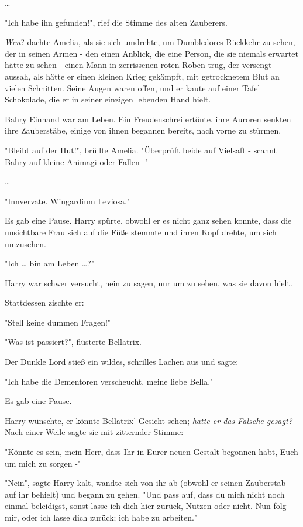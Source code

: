 {…

"Ich habe ihn gefunden!", rief die Stimme des alten Zauberers.

\emph{Wen}? dachte Amelia, als sie sich umdrehte, um Dumbledores Rückkehr zu sehen, der in seinen Armen - den einen Anblick, die eine Person, die sie niemals erwartet hätte zu sehen - einen Mann in zerrissenen roten Roben trug, der versengt aussah, als hätte er einen kleinen Krieg gekämpft, mit getrocknetem Blut an vielen Schnitten. Seine Augen waren offen, und er kaute auf einer Tafel Schokolade, die er in seiner einzigen lebenden Hand hielt.

Bahry Einhand war am Leben. Ein Freudenschrei ertönte, ihre Auroren senkten ihre Zauberstäbe, einige von ihnen begannen bereits, nach vorne zu stürmen.

"Bleibt auf der Hut!", brüllte Amelia. "Überprüft beide auf Vielsaft - scannt Bahry auf kleine Animagi oder Fallen -"

…

"Innvervate. Wingardium Leviosa."

Es gab eine Pause. Harry spürte, obwohl er es nicht ganz sehen konnte, dass die unsichtbare Frau sich auf die Füße stemmte und ihren Kopf drehte, um sich umzusehen.

"Ich … bin am Leben …?"

Harry war schwer versucht, nein zu sagen, nur um zu sehen, was sie davon hielt.

Stattdessen zischte er:

"Stell keine dummen Fragen!"

"Was ist passiert?", flüsterte Bellatrix.

Der Dunkle Lord stieß ein wildes, schrilles Lachen aus und sagte:

"Ich habe die Dementoren verscheucht, meine liebe Bella."

Es gab eine Pause.

Harry wünschte, er könnte Bellatrix' Gesicht sehen; \emph{hatte er das Falsche gesagt?} Nach einer Weile sagte sie mit zitternder Stimme:

"Könnte es sein, mein Herr, dass Ihr in Eurer neuen Gestalt begonnen habt, Euch um mich zu sorgen -"

"Nein", sagte Harry kalt, wandte sich von ihr ab (obwohl er seinen Zauberstab auf ihr behielt) und begann zu gehen. "Und pass auf, dass du mich nicht noch einmal beleidigst, sonst lasse ich dich hier zurück, Nutzen oder nicht. Nun folg mir, oder ich lasse dich zurück; ich habe zu arbeiten."

}
